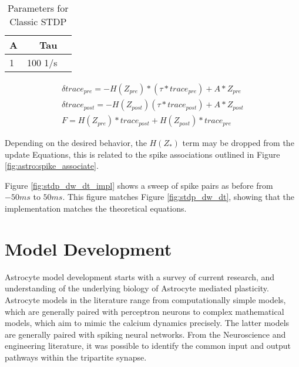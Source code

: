 \begin{table}[!htp] \centering
  \caption{Parameters for Classic STDP} \label{table:classic_stdp_params}
  \scriptsize
  \begin{tabular}{lrr}\toprule
    A &Tau \\\midrule
    1 &100 1/s \\
    \bottomrule
  \end{tabular}
\end{table}


\begin{align}
  \delta trace_{pre} = -H(Z_{pre})*(\tau * trace_{pre}) +
  A*Z_{pre} \label{eq:song_impl_pre} \\ 
  \delta trace_{post} = -H(Z_{post})(\tau * trace_{post}) +
  A*Z_{post} \label{eq:song_impl_post} \\
  F = H(Z_{pre}) * trace_{post} + H(Z_{post}) *
  trace_{pre} \label{eq:song_impl_dw}
\end{align}

Depending on the desired behavior, the $H(Z_*)$ term may be dropped from the
update Equations, this is related to the spike associations outlined in Figure
\ref{fig:astro:spike_associate}.

Figure \ref{fig:stdp_dw_dt_impl} shows a sweep of spike pairs as before from
$-50ms$ to $50ms$. This figure matches Figure \ref{fig:stdp_dw_dt}, showing that
the implementation matches the theoretical equations.




\section{Model Development}
Astrocyte model development starts with a survey of current research, and
understanding of the underlying biology of Astrocyte mediated
plasticity. Astrocyte models in the literature range from computationally simple
models, which are generally paired with perceptron neurons to complex
mathematical models, which aim to mimic the calcium dynamics precisely. The
latter models are generally paired with spiking neural networks. From the
Neuroscience and engineering literature, it was possible to identify the common
input and output pathways within the tripartite synapse. 

